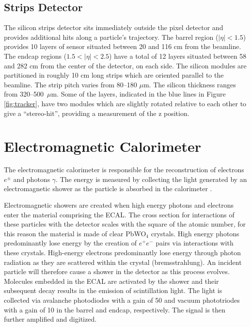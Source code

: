 \subsection{Strips Detector}

The silicon strips detector sits immediately outside the pixel detector and provides additional hits along a particle's trajectory. The barrel region ($|\eta|<1.5$) provides 10 layers of sensor situated between 20 and 116 cm from the beamline. The endcap regions ($1.5<|\eta|<2.5$) have a total of 12 layers situated between 58 and 282 cm from the center of the detector, on each side. The silicon modules are partitioned in roughly 10 cm long strips which are oriented parallel to the beamline. The strip pitch varies from 80--180 $\mu$m. The silicon thickness ranges from 320--500~$\mu$m. Some of the layers, indicated in the blue lines in Figure \ref{fig:tracker}, have two modules which are slightly rotated relative to each other to give a ``stereo-hit'', providing a measurement of the z position.

\section{Electromagnetic Calorimeter}

The electromagnetic calorimeter is responsible for the reconstruction of electrons $e^{\pm}$ and photons $\gamma$. The energy is measured by collecting the light generated by an electromagnetic shower as the particle is absorbed in the calorimeter \cite{ecaltdr, ecaltdradd}. 

Electromagnetic showers are created when high energy photons and electrons enter the material comprising the ECAL. The cross section for interactions of these particles with the detector scales with the square of the atomic number, for this reason the material is made of clear PbWO$_{4}$ crystals. High energy photons predominantly lose energy by the creation of $e^{+}e^{-}$ pairs via interactions with these crystals. High-energy electrons predominantly lose energy through photon radiation as they are scattered within the crystal (bremsstrahlung). An incident particle will therefore cause a shower in the detector as this process evolves. Molecules embedded in the ECAL are activated by the shower and their subsequent decay results in the emission of scintillation light. The light is collected via avalanche photodiodes with a gain of 50 and vacuum phototriodes with a gain of 10 in the barrel and endcap, respectively. The signal is then further amplified and digitized.

